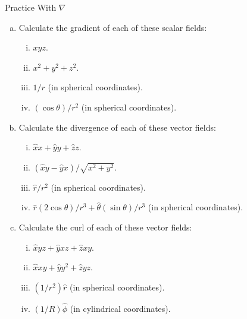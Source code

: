 \documentclass{esg8022pset}
\begin{document}
\begin{problem}{Practice With \noexpand\texorpdfstring{$\nabla$}{∇}}
  \begin{enumerate}[(a)]
    \item Calculate the gradient of each of these scalar fields:
      \begin{enumerate}[(i)]
        \item $xyz$.
        \item $x^2 + y^2 + z^2$.
        \item $1/r$ (in spherical coordinates).
        \item $(\cos\theta) / r^2$ (in spherical coordinates).
      \end{enumerate}
    \item Calculate the divergence of each of these vector fields:
      \begin{enumerate}[(i)]
        \item $\hat{x} x + \hat{y} y + \hat{z} z$.
        \item $(\hat{x} y - \hat{y} x) / \sqrt{x^2 + y^2}$.
        \item $\hat{r}/r^2$ (in spherical coordinates).
        \item $\hat{r}(2\cos\theta)/r^3 + \hat{\theta}(\sin\theta)/r^3$ (in spherical coordinates).
      \end{enumerate}
    \item Calculate the curl of each of these vector fields:
      \begin{enumerate}[(i)]
        \item $\hat{x} yz + \hat{y} xz + \hat{z} xy$.
        \item $\hat{x} xy + \hat{y} y^2 + \hat{z} yz$.
        \item $(1/r^2)\hat{r}$ (in spherical coordinates).
        \item $(1/R)\hat{\phi}$ (in cylindrical coordinates).
      \end{enumerate}
  \end{enumerate}
\end{problem}
\end{document}
